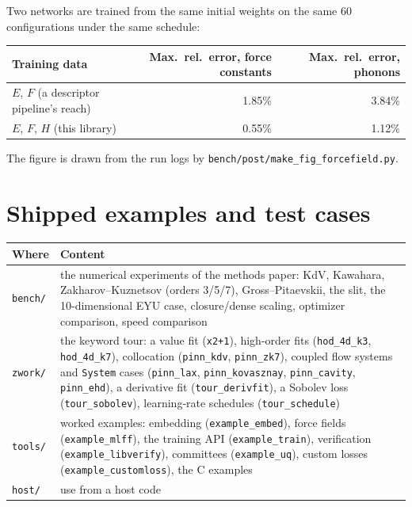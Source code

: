 \documentclass[10pt,a4paper]{article}
\newcommand{\code}[1]{\texttt{#1}}
\begin{document}
Two networks are trained from the same initial weights on the same 60
configurations under the same schedule:

\begin{center}
\begin{tabular}{@{}lrr@{}}
\toprule
Training data & Max.\ rel.\ error, force constants & Max.\ rel.\ error, phonons \\
\midrule
$E$, $F$ (a descriptor pipeline's reach) & 1.85\% & 3.84\% \\
$E$, $F$, $H$ (this library) & 0.55\% & 1.12\% \\
\bottomrule
\end{tabular}
\end{center}

The figure is drawn from the run logs by
\code{bench/post/make\_fig\_forcefield.py}.

\section{Shipped examples and test cases}

\begin{longtable}{@{}p{}p{}@{}}
\toprule
Where & Content \\
\midrule
\endhead
\code{bench/} & the numerical experiments of the methods paper: KdV, Kawahara, Zakharov--Kuznetsov (orders 3/5/7), Gross--Pitaevskii, the slit, the 10-dimensional EYU case, closure/dense scaling, optimizer comparison, speed comparison\\
\code{zwork/} & the keyword tour: a value fit (\code{x2+1}), high-order fits (\code{hod\_4d\_k3}, \code{hod\_4d\_k7}), collocation (\code{pinn\_kdv}, \code{pinn\_zk7}), coupled flow systems and \code{System} cases (\code{pinn\_lax}, \code{pinn\_kovasznay}, \code{pinn\_cavity}, \code{pinn\_ehd}), a derivative fit (\code{tour\_derivfit}), a Sobolev loss (\code{tour\_sobolev}), learning-rate schedules (\code{tour\_schedule})\\
\code{tools/} & worked examples: embedding (\code{example\_embed}), force fields (\code{example\_mlff}), the training API (\code{example\_train}), verification (\code{example\_libverify}), committees (\code{example\_uq}), custom losses (\code{example\_customloss}), the C examples\\
\code{host/} & use from a host code\\
\bottomrule
\end{longtable}

\end{document}

